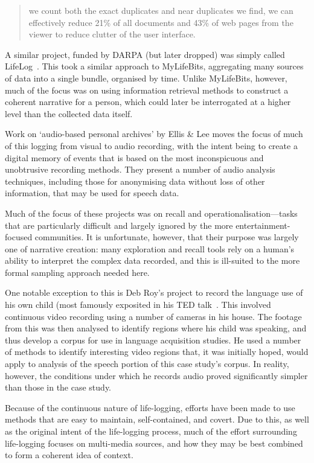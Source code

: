 \begin{quote}
we count both the exact duplicates and near duplicates we find, we can effectively reduce 21\% of all documents and 43\% of web pages from the viewer to reduce clutter of the user interface.
\end{quote}

A similar project, funded by DARPA (but later dropped) was simply called LifeLog~\cite{allen2008dredging}.  This took a similar approach to MyLifeBits, aggregating many sources of data into a single bundle, organised by time.  Unlike MyLifeBits, however, much of the focus was on using information retrieval methods to construct a coherent narrative for a person, which could later be interrogated at a higher level than the collected data itself.

Work on `audio-based personal archives' by Ellis \& Lee\cite{ellis2004audiolog} moves the focus of much of this logging from visual to audio recording, with the intent being to create a digital memory of events that is based on the most inconspicuous and unobtrusive recording methods.  They present a number of audio analysis techniques, including those for anonymising data without loss of other information, that may be used for speech data.

Much of the focus of these projects was on recall and operationalisation---tasks that are particularly difficult and largely ignored by the more entertainment-focused communities.  It is unfortunate, however, that their purpose was largely one of narrative creation: many exploration and recall tools rely on a human's ability to interpret the complex data recorded, and this is ill-suited to the more formal sampling approach needed here.

One notable exception to this is Deb Roy's project to record the language use of his own child (most famously exposited in his TED talk~\cite{roy2011ted}.  This involved continuous video recording using a number of cameras in his house.  The footage from this was then analysed to identify regions where his child was speaking, and thus develop a corpus for use in language acquisition studies.  He used a number of methods to identify interesting video regions that, it was initially hoped, would apply to analysis of the speech portion of this case study's corpus.  In reality, however, the conditions under which he records audio proved significantly simpler than those in the case study.



Because of the continuous nature of life-logging, efforts have been made to use methods that are easy to maintain, self-contained, and covert.  Due to this, as well as the original intent of the life-logging process, much of the effort surrounding life-logging focuses on multi-media sources, and how they may be best combined to form a coherent idea of context.  

